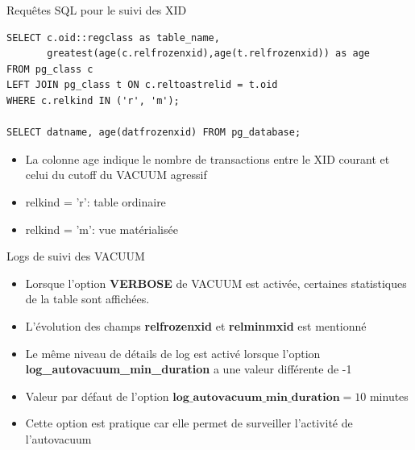 \begin{frame}[fragile]{Requêtes SQL pour le suivi des XID}

\begin{tiny}
\begin{Verbatim}[commandchars=\\\{\}]
SELECT c.oid::regclass as table_name,
       greatest(age(c.relfrozenxid),age(t.relfrozenxid)) as age
FROM pg_class c
LEFT JOIN pg_class t ON c.reltoastrelid = t.oid
WHERE c.relkind IN ('r', 'm');

SELECT datname, age(datfrozenxid) FROM pg_database;
\end{Verbatim}
\end{tiny}

\begin{itemize}
   \item La colonne age indique le nombre de transactions entre le XID courant et celui du cutoff du VACUUM agressif
   \item relkind = 'r': table ordinaire
   \item relkind = 'm': vue matérialisée
\end{itemize}

\begin{toile}
\end{toile}

\end{frame}


\begin{frame}{Logs de suivi des VACUUM}

\begin{itemize}
   \item Lorsque l'option \textbf{VERBOSE} de VACUUM est activée, certaines statistiques de la table sont affichées.
   \item L'évolution des champs \textbf{relfrozenxid} et \textbf{relminmxid} est mentionné
   \item Le même niveau de détails de log est activé lorsque l'option \textbf{log\_autovacuum\_min\_duration} a une valeur différente de -1
   \item Valeur par défaut de l'option $\textbf{log\_autovacuum\_min\_duration} = 10$ minutes
   \item Cette option est pratique car elle permet de surveiller l'activité de l'autovacuum
\end{itemize}

\end{frame}

